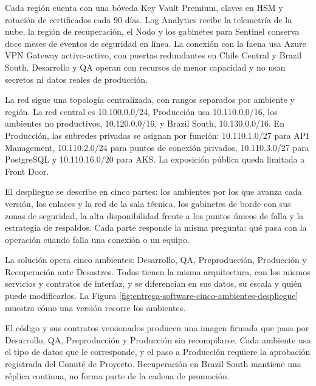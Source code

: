 \documentclass[subdoc]{../../comun/overfore}
\begin{document}
Cada región cuenta con una bóveda Key Vault Premium, claves en HSM y rotación de certificados cada 90 días. Log Analytics recibe la telemetría de la nube, la región de recuperación, el Nodo y los gabinetes para Sentinel conserva doce meses de eventos de seguridad en línea. La conexión con la faena usa Azure VPN Gateway activo-activo, con puertas redundantes en Chile Central y Brazil South. Desarrollo y QA operan con recursos de menor capacidad y no usan secretos ni datos reales de producción.

La red sigue una topología centralizada, con rangos separados por ambiente y región. La red central es 10.100.0.0/24, Producción usa 10.110.0.0/16, los ambientes no productivos, 10.120.0.0/16, y Brazil South, 10.130.0.0/16. En Producción, las subredes privadas se asignan por función: 10.110.1.0/27 para API Management, 10.110.2.0/24 para puntos de conexión privados, 10.110.3.0/27 para PostgreSQL y 10.110.16.0/20 para AKS. La exposición pública queda limitada a Front Door.

El despliegue se describe en cinco partes: los ambientes por los que avanza cada versión, los enlaces y la red de la sala técnica, los gabinetes de borde con sus zonas de seguridad, la alta disponibilidad frente a los puntos únicos de falla y la estrategia de respaldos. Cada parte responde la misma pregunta: qué pasa con la operación cuando falla una conexión o un equipo.

La solución opera cinco ambientes: Desarrollo, QA, Preproducción, Producción y Recuperación ante Desastres. Todos tienen la misma arquitectura, con los mismos servicios y contratos de interfaz, y se diferencian en sus datos, su escala y quién puede modificarlos. La Figura \ref{fig:entrega-software-cinco-ambientes-despliegue} muestra cómo una versión recorre los ambientes.

\begin{horizontal}
\end{horizontal}
El código y sus contratos versionados producen una imagen firmada que pasa por Desarrollo, QA, Preproducción y Producción sin recompilarse. Cada ambiente usa el tipo de datos que le corresponde, y el paso a Producción requiere la aprobación registrada del Comité de Proyecto. Recuperación en Brazil South mantiene una réplica continua, no forma parte de la cadena de promoción.
\end{document}
